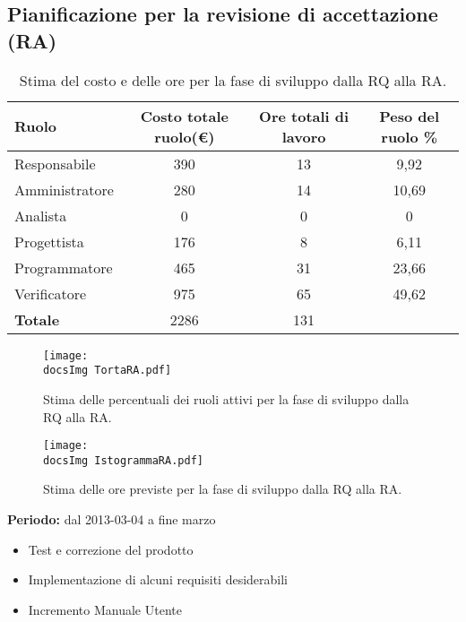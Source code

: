 {	\subsection{Pianificazione per la revisione di accettazione (RA)}{
		\begin{table}[h!]
		\begin{center}
			\begin{tabular}{l c c c}				
				\toprule
				Ruolo&	 Costo totale ruolo(\euro) 	&	Ore totali di lavoro &	Peso del ruolo \% \\ 
				\midrule
				Responsabile&	390&		13&	9,92\\
				Amministratore&	280&		14&	10,69\\
				Analista	&	0&	0& 0\\
				Progettista&		176&	8&	6,11\\
				Programmatore&	465&	31&	23,66\\
				Verificatore	&	975&		65&	49,62\\ \hline
				\textbf{Totale}&		2286&	131	&\\
				\bottomrule
			\end{tabular}
		\end{center}	
		\caption{Stima del costo e delle ore per la fase di sviluppo dalla RQ alla RA.}
	\end{table}
	\begin{figure}[h!]
	\centering
		\texttt{[image: \\docsImg TortaRA.pdf]}
		\caption{Stima delle percentuali dei ruoli attivi per la fase di sviluppo dalla RQ alla RA.}  		
	\texttt{[image: \\docsImg IstogrammaRA.pdf]}

	\caption{Stima delle ore previste per la fase di sviluppo dalla RQ alla RA.}
	
	\end{figure} 	
		\textbf{Periodo:} dal 2013-03-04 a fine marzo\\
		\begin{itemize}
			\item Test e correzione del prodotto
			\item Implementazione di alcuni requisiti desiderabili
			\item Incremento Manuale Utente
		 

\end{itemize}}}
